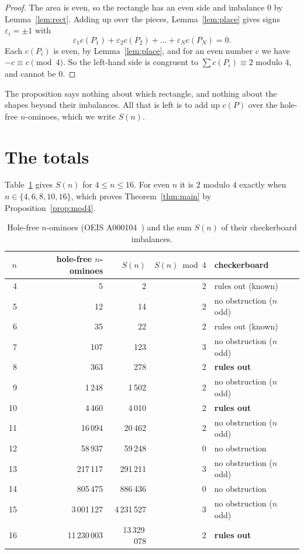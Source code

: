 \documentclass[11pt]{article}
\begin{document}
\begin{proof}
The area is even, so the rectangle has an even side and imbalance $0$ by Lemma~\ref{lem:rect}. Adding up over the
pieces, Lemma~\ref{lem:place} gives signs $\varepsilon_i=\pm1$ with
\[
\varepsilon_1c(P_1)+\varepsilon_2c(P_2)+\dots+\varepsilon_Nc(P_N)=0 .
\]
Each $c(P_i)$ is even, by Lemma~\ref{lem:place}, and for an even number $c$ we have $-c\equiv c\pmod 4$. So the
left-hand side is congruent to $\sum c(P_i)\equiv2$ modulo $4$, and cannot be $0$.
\end{proof}

The proposition says nothing about which rectangle, and nothing about the shapes beyond their imbalances. All that
is left is to add up $c(P)$ over the hole-free $n$-ominoes, which we write $S(n)$.

\section{The totals}

Table~\ref{tab:S} gives $S(n)$ for $4\le n\le16$. For even $n$ it is $2$ modulo $4$ exactly when
$n\in\{4,6,8,10,16\}$, which proves Theorem~\ref{thm:main} by Proposition~\ref{prop:mod4}.

\begin{table}[ht]
\centering
\begin{tabular}{rrrrl}
\toprule
$n$ & hole-free $n$-ominoes & $S(n)$ & $S(n)\bmod 4$ & checkerboard \\
\midrule
4 & 5 & 2 & 2 & rules out (known) \\
5 & 12 & 14 & 2 & no obstruction ($n$ odd) \\
6 & 35 & 22 & 2 & rules out (known) \\
7 & 107 & 123 & 3 & no obstruction ($n$ odd) \\
8 & 363 & 278 & 2 & \textbf{rules out} \\
9 & 1\,248 & 1\,502 & 2 & no obstruction ($n$ odd) \\
10 & 4\,460 & 4\,010 & 2 & \textbf{rules out} \\
11 & 16\,094 & 20\,462 & 2 & no obstruction ($n$ odd) \\
12 & 58\,937 & 59\,248 & 0 & no obstruction \\
13 & 217\,117 & 291\,211 & 3 & no obstruction ($n$ odd) \\
14 & 805\,475 & 886\,436 & 0 & no obstruction \\
15 & 3\,001\,127 & 4\,231\,527 & 3 & no obstruction ($n$ odd) \\
16 & 11\,230\,003 & 13\,329\,078 & 2 & \textbf{rules out} \\
\bottomrule
\end{tabular}
\caption{Hole-free $n$-ominoes (OEIS A000104~\cite{A000104}) and the sum $S(n)$ of their checkerboard imbalances.}
\label{tab:S}
\end{table}
\end{document}
